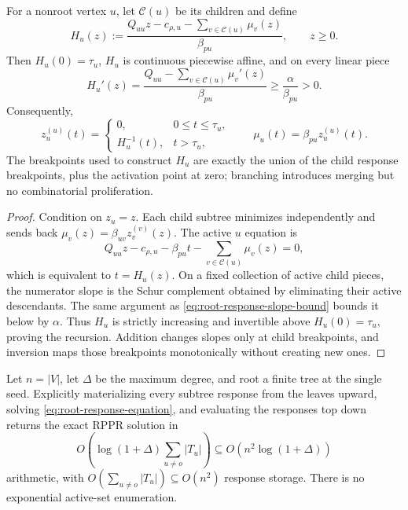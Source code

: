 \begin{corollary}
\label{cor:inverse-tree-response}
For a nonroot vertex $u$, let $\mathcal C(u)$ be its children and define
\begin{equation}
 H_u(z)
 :=\frac{
  Q_{uu}z-c_{\rho,u}
  -\sum_{v\in\mathcal C(u)}\mu_v(z)
 }{\beta_{pu}},
 \qquad z\geq0.
 \label{eq:inverse-response-map}
\end{equation}
Then $H_u(0)=\tau_u$, $H_u$ is continuous piecewise affine, and on every
linear piece
\begin{equation}
 H_u'(z)
 =\frac{Q_{uu}-\sum_{v\in\mathcal C(u)}\mu_v'(z)}{\beta_{pu}}
 \geq\frac{\alpha}{\beta_{pu}}>0.
 \label{eq:inverse-response-slope}
\end{equation}
Consequently,
\begin{equation}
 z_u^{(u)}(t)
 =\begin{cases}
  0,&0\leq t\leq\tau_u,\\
  H_u^{-1}(t),&t>\tau_u,
 \end{cases}
 \qquad
 \mu_u(t)=\beta_{pu}z_u^{(u)}(t).
 \label{eq:tree-response-inverse}
\end{equation}
The breakpoints used to construct $H_u$ are exactly the union of the child
response breakpoints, plus the activation point at zero; branching introduces
merging but no combinatorial proliferation.
\end{corollary}

\begin{proof}
Condition on $z_u=z$.  Each child subtree minimizes independently and sends
back $\mu_v(z)=\beta_{uv}z_v^{(v)}(z)$.  The active $u$ equation is
\[
 Q_{uu}z-c_{\rho,u}-\beta_{pu}t
 -\sum_{v\in\mathcal C(u)}\mu_v(z)=0,
\]
which is equivalent to $t=H_u(z)$.  On a fixed collection of active child
pieces, the numerator slope is the Schur complement obtained by eliminating
their active descendants.  The same argument as
\cref{eq:root-response-slope-bound} bounds it below by $\alpha$.  Thus $H_u$
is strictly increasing and invertible above $H_u(0)=\tau_u$, proving the
recursion.  Addition changes slopes only at child breakpoints, and inversion
maps those breakpoints monotonically without creating new ones.
\end{proof}

\begin{corollary}
\label{cor:finite-tree-message-solver}
Let $n=|V|$, let $\Delta$ be the maximum degree, and root a finite tree at the
single seed.  Explicitly materializing every subtree response from the leaves
upward, solving \cref{eq:root-response-equation}, and evaluating the responses
top down returns the exact RPPR solution in
\begin{equation}
 O\!\left(
  \log(1+\Delta)\sum_{u\neq o}|T_u|
 \right)
 \subseteq O(n^2\log(1+\Delta))
 \label{eq:finite-tree-message-work}
\end{equation}
arithmetic, with $O(\sum_{u\neq o}|T_u|)\subseteq O(n^2)$ response storage.
There is no exponential active-set enumeration.
\end{corollary}

